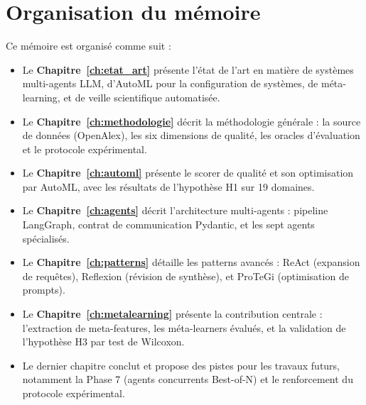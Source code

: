 \section{Organisation du mémoire}

Ce mémoire est organisé comme suit :

\begin{itemize}
  \item Le \textbf{Chapitre~\ref{ch:etat_art}} présente l'état de l'art en
    matière de systèmes multi-agents LLM, d'AutoML pour la configuration
    de systèmes, de méta-learning, et de veille scientifique automatisée.

  \item Le \textbf{Chapitre~\ref{ch:methodologie}} décrit la méthodologie
    générale : la source de données (OpenAlex), les six dimensions de qualité,
    les oracles d'évaluation et le protocole expérimental.

  \item Le \textbf{Chapitre~\ref{ch:automl}} présente le scorer de qualité
    et son optimisation par AutoML, avec les résultats de l'hypothèse H1
    sur 19 domaines.

  \item Le \textbf{Chapitre~\ref{ch:agents}} décrit l'architecture
    multi-agents : pipeline LangGraph, contrat de communication Pydantic,
    et les sept agents spécialisés.

  \item Le \textbf{Chapitre~\ref{ch:patterns}} détaille les patterns avancés :
    ReAct (expansion de requêtes), Reflexion (révision de synthèse), et
    ProTeGi (optimisation de prompts).

  \item Le \textbf{Chapitre~\ref{ch:metalearning}} présente la contribution
    centrale : l'extraction de meta-features, les méta-learners évalués,
    et la validation de l'hypothèse H3 par test de Wilcoxon.

  \item Le dernier chapitre conclut et propose des pistes pour les
    travaux futurs, notamment la Phase 7 (agents concurrents Best-of-N)
    et le renforcement du protocole expérimental.
\end{itemize}
